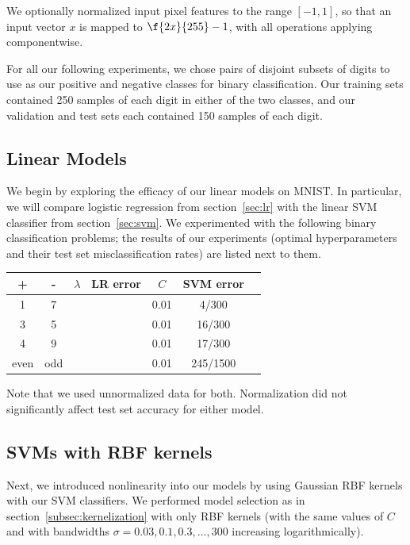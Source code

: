 \documentclass{article}
\begin{document}
\begin{multicols}{2}
We optionally normalized input pixel features to the range $[-1, 1]$,
so that an input vector $x$ is mapped to $\f{2x}{255}-1$,
with all operations applying componentwise.

For all our following experiments,
we chose pairs of disjoint subsets of digits
to use as our positive and negative classes for binary classification.
Our training sets contained 250 samples of each digit in either of the two classes,
and our validation and test sets each contained 150 samples of each digit.

\subsection{Linear Models}

We begin by exploring the efficacy of our linear models on MNIST.
In particular, we will compare logistic regression from section~\ref{sec:lr}
with the linear SVM classifier from section~\ref{sec:svm}.
We experimented with the following binary classification problems;
the results of our experiments
(optimal hyperparameters and their test set misclassification rates)
are listed next to them.
\begin{center}
\begin{tabular}{|c|c||c|c||c|c|c|}
\hline
+ & - & $\lambda$ & LR error & $C$ & SVM error \\\hline
1 & 7 & & & 0.01 & 4/300 \\
3 & 5 & & & 0.01 & 16/300 \\
4 & 9 & & & 0.01 & 17/300\\
even & odd & & & 0.01 & 245/1500\\\hline
\end{tabular}
\end{center}

Note that we used unnormalized data for both.
Normalization did not significantly affect test set accuracy
for either model.



\subsection{SVMs with RBF kernels}

Next, we introduced nonlinearity into our models
by using Gaussian RBF kernels with our SVM classifiers.
We performed model selection as in section~\ref{subsec:kernelization}
with only RBF kernels
(with the same values of $C$
and with bandwidths $\sigma = 0.03,0.1,0.3,\dots,300$ increasing logarithmically).


\end{multicols}
\end{document}
